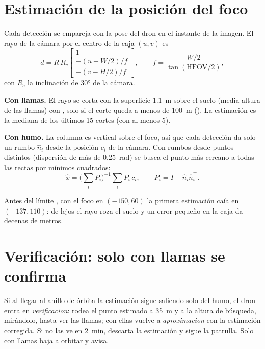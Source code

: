 \section{Estimación de la posición del foco}

Cada detección se empareja con la pose del dron en el instante de la imagen. El rayo de la cámara
por el centro de la caja $(u,v)$ es
\begin{equation}
d = R\,R_c\begin{bmatrix}1\\ -(u - W/2)/f\\ -(v - H/2)/f\end{bmatrix},\qquad
f = \frac{W/2}{\tan(\text{HFOV}/2)},
\end{equation}
con $R_c$ la inclinación de 30° de la cámara.

\textbf{Con llamas.} El rayo se corta con la superficie 1.1~m sobre el suelo (media altura de las
llamas) con , solo si el corte queda a menos de 100~m
(). La estimación es la mediana de los últimos 15 cortes (con al menos 5).

\textbf{Con humo.} La columna es vertical sobre el foco, así que cada detección da solo un rumbo
$\hat n_i$ desde la posición $c_i$ de la cámara. Con rumbos desde puntos distintos (dispersión de
más de 0.25~rad) se busca el punto más cercano a todas las rectas por mínimos cuadrados:
\begin{equation}
\hat x = \Big(\sum_i P_i\Big)^{-1}\sum_i P_i\,c_i,\qquad P_i = I - \hat n_i\hat n_i^\top .
\end{equation}

\begin{leccion}
Antes del límite , con el foco en $(-150,60)$ la primera estimación caía en
$(-137,110)$: de lejos el rayo roza el suelo y un error pequeño en la caja da decenas de metros.
\end{leccion}

\section{Verificación: solo con llamas se confirma}

Si al llegar al anillo de órbita la estimación sigue saliendo solo del humo, el dron entra en
\emph{verificacion}: rodea el punto estimado a 35~m y a la altura de búsqueda, mirándolo, hasta ver
las llamas; con ellas vuelve a \emph{aproximacion} con la estimación corregida. Si no las ve en
2~min, descarta la estimación y sigue la patrulla. Solo con llamas baja a orbitar y avisa.


